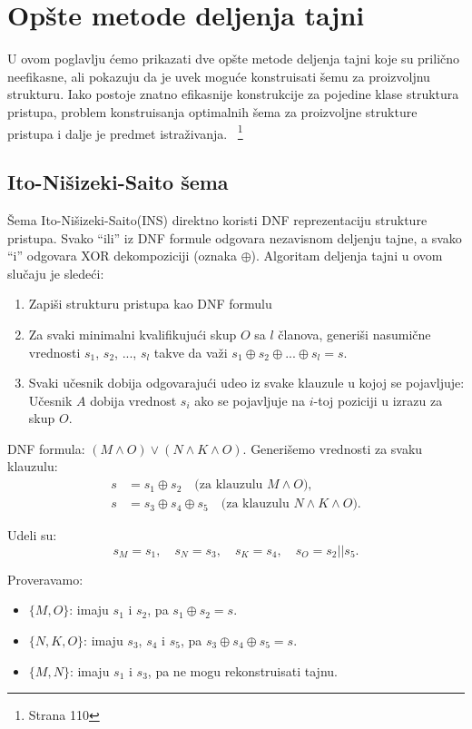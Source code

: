 \section{Opšte metode deljenja tajni}
U ovom poglavlju ćemo prikazati dve opšte metode deljenja tajni koje su prilično neefikasne, ali pokazuju da je uvek moguće konstruisati šemu za proizvoljnu strukturu. Iako postoje znatno efikasnije konstrukcije za pojedine klase struktura pristupa, problem konstruisanja optimalnih šema za proizvoljne strukture pristupa i dalje je predmet istraživanja.~\cite{secret-sharing} \footnote{Strana 110}
\subsection{Ito-Nišizeki-Saito šema}
Šema Ito-Nišizeki-Saito(INS) direktno koristi DNF reprezentaciju strukture pristupa.
Svako ``ili'' iz DNF formule odgovara nezavisnom deljenju tajne, a svako ``i'' odgovara XOR dekompoziciji (oznaka $\oplus$).
Algoritam deljenja tajni u ovom slučaju je sledeći:
\begin{enumerate}
\item Zapiši strukturu pristupa kao DNF formulu
\item Za svaki minimalni kvalifikujući skup $O$ sa $l$ članova, generiši nasumične vrednosti $s_1$, $s_2$, ..., $s_{l}$ takve da važi $s_1 \oplus s_2 \oplus ... \oplus s_l = s$. 
\item Svaki učesnik dobija odgovarajući udeo iz svake klauzule u kojoj se pojavljuje: Učesnik $A$ dobija vrednost $s_i$ ako se pojavljuje na $i$-toj poziciji u izrazu za skup $O$.
\end{enumerate}

\begin{example}
DNF formula: $(M \wedge O) \vee (N \wedge K \wedge O)$. 
Generišemo vrednosti za svaku klauzulu:
\begin{align*}
s &= s_1 \oplus s_2 \quad \text{(za klauzulu } M \wedge O\text{)}, \\
s &= s_3 \oplus s_4 \oplus s_5 \quad \text{(za klauzulu } N \wedge K \wedge O\text{)}.
\end{align*}

Udeli su:\[ s_M = s_1, \quad s_N = s_3, \quad s_K = s_4, \quad s_O = s_2 || s_5.\]

Proveravamo:
\begin{itemize}
\item $\{M, O\}$: imaju $s_1$ i $s_2$, pa $s_1 \oplus s_2 = s$.
\item $\{N, K, O\}$: imaju $s_3$, $s_4$ i $s_5$, pa $s_3 \oplus s_4 \oplus s_5 = s$.
\item $\{M, N\}$: imaju $s_1$ i $s_3$, pa ne mogu rekonstruisati tajnu.
\end{itemize}
\end{example}

